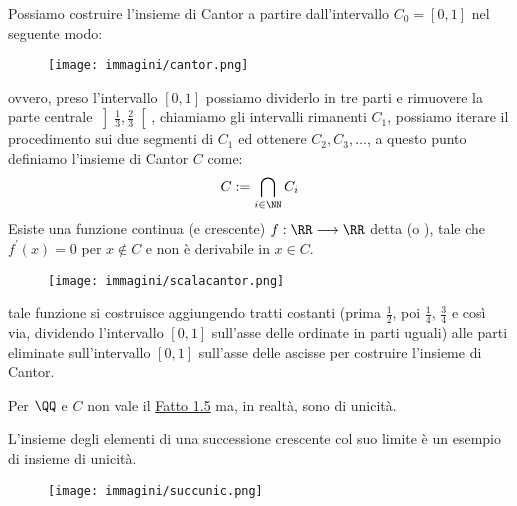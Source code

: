 \documentclass[11pt]{scrartcl}
\begin{document}
Possiamo costruire l'insieme di Cantor a partire dall'intervallo $C_0 = [0,1]$ nel seguente modo:

\begin{center}
	\begin{figure}[h]
		\centering
		\texttt{[image: immagini/cantor.png]}
	\end{figure}
\end{center}

ovvero, preso l'intervallo $[0,1]$ possiamo dividerlo in tre parti e rimuovere la parte centrale $\displaystyle\left]\frac 13, \frac 23\right[$, chiamiamo gli intervalli rimanenti $C_1$, possiamo iterare il procedimento sui due segmenti di $C_1$ ed ottenere $C_2,C_3,\ldots$, a questo punto 
definiamo l'insieme di Cantor $C$ come:
\[ C := \bigcap_{i \in \NN}C_i
	\]
Esiste una funzione continua (e crescente) $f : \RR \longrightarrow \RR$ detta  (o ), tale che $f^{\prime}(x) = 0$ per $x \not\in C$ e non è 
derivabile in $x \in C$.

\begin{center}
	\begin{figure}[h]
		\centering
		\texttt{[image: immagini/scalacantor.png]}
	\end{figure}
\end{center}

tale funzione si costruisce aggiungendo tratti costanti (prima $\displaystyle\frac 12$, poi $\displaystyle\frac 14$, $\displaystyle\frac 34$ e così via, dividendo l'intervallo $[0,1]$ sull'asse delle ordinate in parti uguali) alle parti eliminate sull'intervallo
$[0,1]$ sull'asse delle ascisse per costruire l'insieme di Cantor.

\begin{note}
Per $\QQ$ e $C$ non vale il \hyperref[unicità]{Fatto 1.5} ma, in realtà, sono di unicità.
\end{note}

\begin{exampleb}
L'insieme degli elementi di una successione crescente col suo limite è un esempio di insieme di unicità.
\end{exampleb}

\begin{center}
	\begin{figure}[h]
		\centering
		\texttt{[image: immagini/succunic.png]}
	\end{figure}
\end{center}
\end{document}
